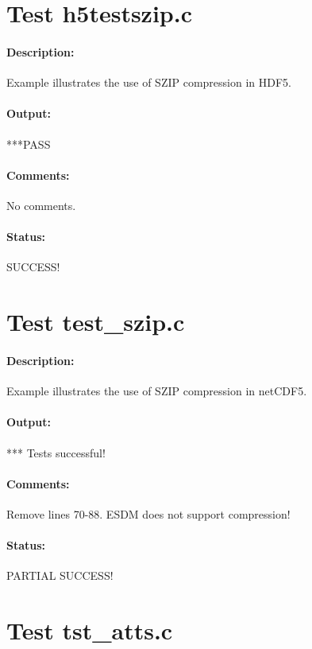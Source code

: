 \section{Test h5testszip.c}

\paragraph{Description:} Example illustrates the use of SZIP compression in HDF5.

\paragraph{Output:} ***PASS

\paragraph{Comments:} No comments.

\paragraph{Status:} SUCCESS!

\section{Test test\_szip.c}

\paragraph{Description:} Example illustrates the use of SZIP compression in netCDF5.

\paragraph{Output:} *** Tests successful!

\paragraph{Comments:} Remove lines 70-88. ESDM does not support compression!

\paragraph{Status:} PARTIAL SUCCESS!

\section{Test tst\_atts.c}

